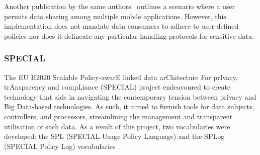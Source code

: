 Another publication by the same authors~\citep{hutchison_framework_2013} outlines a scenario where a user permits data sharing among multiple mobile applications.
However, this implementation does not mandate data consumers to adhere to user-defined policies nor does it delineate any particular handling protocols for sensitive data.


\subsubsection{SPECIAL}
\label{sec:special}

The EU H2020 Scalable Policy-awarE linked data arChitecture For prIvacy, trAnsparency and compLiance (SPECIAL) project endeavoured to create technology that aids in navigating the contemporary tension between privacy and Big Data-based technologies.
As such, it aimed to furnish tools for data subjects, controllers, and processors, streamlining the management and transparent utilisation of such data.
As a result of this project, two vocabularies were developed: the SPL (SPECIAL Usage Policy Language) and the SPLog (SPECIAL Policy Log) vocabularies~\citep{gangemi_scalable_2018}.

